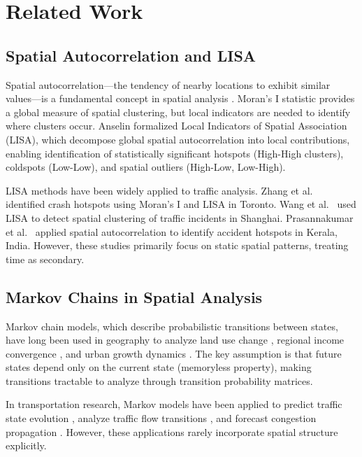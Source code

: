 \documentclass[11pt,a4paper]{article}
\begin{document}
\section{Related Work}

\subsection{Spatial Autocorrelation and LISA}

Spatial autocorrelation---the tendency of nearby locations to exhibit similar values---is a fundamental concept in spatial analysis \cite{tobler1970}. Moran's I statistic \cite{moran1950} provides a global measure of spatial clustering, but local indicators are needed to identify where clusters occur. Anselin \cite{anselin1995} formalized Local Indicators of Spatial Association (LISA), which decompose global spatial autocorrelation into local contributions, enabling identification of statistically significant hotspots (High-High clusters), coldspots (Low-Low), and spatial outliers (High-Low, Low-High).

LISA methods have been widely applied to traffic analysis. Zhang et al.~\cite{zhang2011} identified crash hotspots using Moran's I and LISA in Toronto. Wang et al.~\cite{wang2013} used LISA to detect spatial clustering of traffic incidents in Shanghai. Prasannakumar et al.~\cite{prasannakumar2011} applied spatial autocorrelation to identify accident hotspots in Kerala, India. However, these studies primarily focus on static spatial patterns, treating time as secondary.

\subsection{Markov Chains in Spatial Analysis}

Markov chain models, which describe probabilistic transitions between states, have long been used in geography to analyze land use change \cite{baker1989}, regional income convergence \cite{rey2001}, and urban growth dynamics \cite{batty1976}. The key assumption is that future states depend only on the current state (memoryless property), making transitions tractable to analyze through transition probability matrices.

In transportation research, Markov models have been applied to predict traffic state evolution \cite{li2015}, analyze traffic flow transitions \cite{cheng2012}, and forecast congestion propagation \cite{min2011}. However, these applications rarely incorporate spatial structure explicitly.
\end{document}
